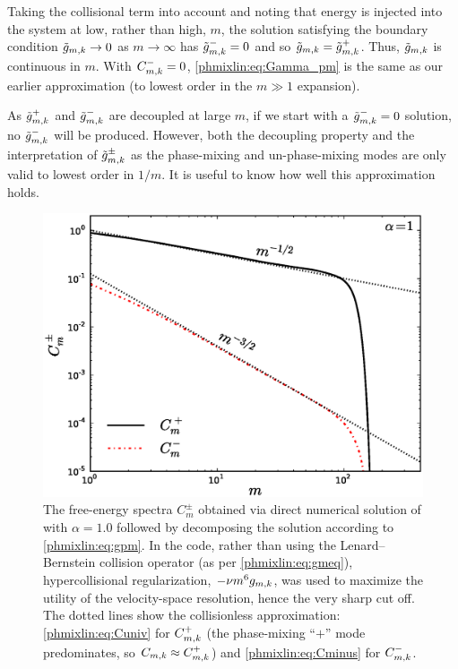 Taking the collisional term into account and noting that energy is injected 
into the system at low, rather than high, $m$, the solution satisfying 
the boundary condition $\tilde g_{m,k}\to 0$ as $m\to\infty$ has $\tilde g_{m,k}^-=0$
and so $\tilde g_{m,k}=\tilde g_{m,k}^+$. Thus, $\tilde g_{m,k}$ is continuous in $m$. 
With $C_{m,k}^-=0$, \eqref{phmixlin:eq:Gamma_pm} is the same as our earlier 
approximation  (to lowest order in the $m\gg1$ expansion). 

As $\tilde g_{m,k}^+$ and $\tilde g_{m,k}^-$ are decoupled at large $m$, if we start with a 
$\tilde g_{m,k}^-=0$ solution, no $\tilde g_{m,k}^-$ will be produced. 
However, both the decoupling property and the interpretation of 
$\tilde g_{m,k}^\pm$ as the phase-mixing and un-phase-mixing modes
are only valid to lowest order in $1/m$. It is useful 
to know how well this approximation holds. 

\begin{figure}
\begin{center}
\includegraphics[width=14.8cm]{figs/phmixlin/Cpm.eps}
\caption{The free-energy spectra $C_m^\pm$ obtained via direct numerical solution 
of  with $\alpha = 1.0$ followed by decomposing the solution 
according to \eqref{phmixlin:eq:gpm}. In the code, rather than using the Lenard--Bernstein 
collision operator (as per \eqref{phmixlin:eq:gmeq}), hypercollisional regularization, $-\nu m^6g_{m,k}$, was used to maximize the utility of the velocity-space resolution, 
hence the very sharp cut off. 
The dotted lines show the collisionless approximation: \eqref{phmixlin:eq:Cuniv} 
for $C_{m,k}^+$ (the phase-mixing ``$+$'' mode predominates, so 
$C_{m,k}\approx C_{m,k}^+$) and \eqref{phmixlin:eq:Cminus} for $C_{m,k}^-$.} 
\label{phmixlin:fig:Cpm}
\end{center}
\end{figure}

